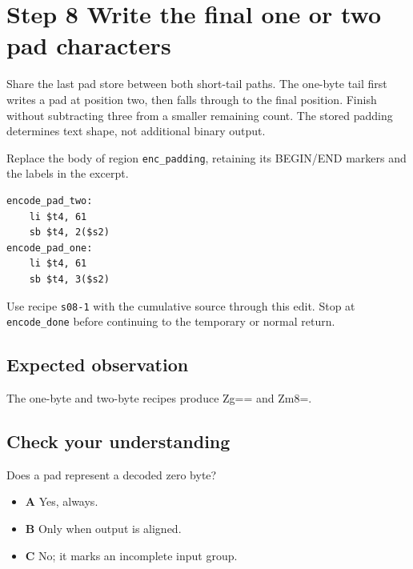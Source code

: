 \section{Step 8 Write the final one or two pad characters}\label{base64-s08}

Share the last pad store between both short-tail paths. The one-byte tail first writes a pad at position two, then falls through to the final position. Finish without subtracting three from a smaller remaining count. The stored padding determines text shape, not additional binary output.

Replace the body of region \texttt{enc\_padding}, retaining its BEGIN/END markers and the labels in the excerpt.

\begin{verbatim}
encode_pad_two:
    li $t4, 61
    sb $t4, 2($s2)
encode_pad_one:
    li $t4, 61
    sb $t4, 3($s2)
\end{verbatim}

Use recipe \texttt{s08-1} with the cumulative source through this edit. Stop at \texttt{encode\_done} before continuing to the temporary or normal return.

\subsection{Expected observation}
The one-byte and two-byte recipes produce Zg== and Zm8=.

\subsection{Check your understanding}
Does a pad represent a decoded zero byte?

\begin{itemize}
  \item \textbf{A} Yes, always.
  \item \textbf{B} Only when output is aligned.
  \item \textbf{C} No; it marks an incomplete input group.
\end{itemize}

